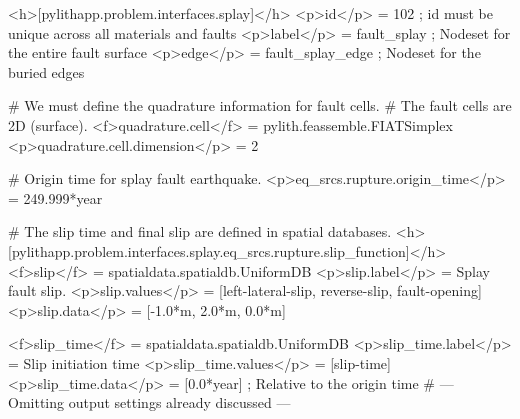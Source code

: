 \begin{cfg}
<h>[pylithapp.problem.interfaces.splay]</h>
<p>id</p> = 102 ; id must be unique across all materials and faults
<p>label</p> = fault_splay ; Nodeset for the entire fault surface
<p>edge</p> = fault_splay_edge ; Nodeset for the buried edges

# We must define the quadrature information for fault cells.
# The fault cells are 2D (surface).
<f>quadrature.cell</f> = pylith.feassemble.FIATSimplex
<p>quadrature.cell.dimension</p> = 2

# Origin time for splay fault earthquake.
<p>eq_srcs.rupture.origin_time</p> = 249.999*year

# The slip time and final slip are defined in spatial databases.
<h>[pylithapp.problem.interfaces.splay.eq_srcs.rupture.slip_function]</h>
<f>slip</f> = spatialdata.spatialdb.UniformDB
<p>slip.label</p> = Splay fault slip.
<p>slip.values</p> = [left-lateral-slip, reverse-slip, fault-opening]
<p>slip.data</p> = [-1.0*m, 2.0*m, 0.0*m]

<f>slip_time</f> = spatialdata.spatialdb.UniformDB
<p>slip_time.label</p>  = Slip initiation time
<p>slip_time.values</p> = [slip-time]
<p>slip_time.data</p> = [0.0*year] ; Relative to the origin time
# --- Omitting output settings already discussed ---
\end{cfg}

